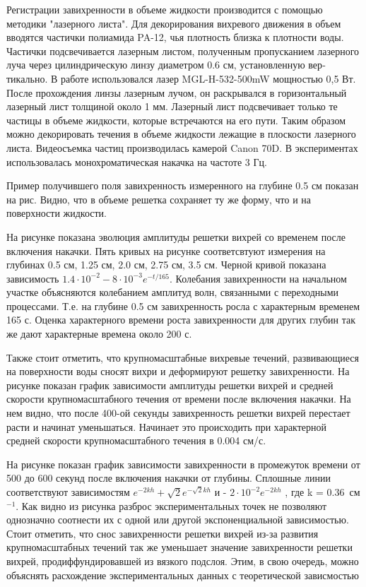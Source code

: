 Регистрации завихренности в объеме жидкости производится с помощью методики "лазерного листа"{}. Для декорирования вихревого движения в объем вводятся частички полиамида PA-12, чья плотность близка к плотности воды. Частички подсвечивается лазерным листом, полученным пропусканием лазер­ного луча через цилиндрическую линзу диаметром 0.6 см, установленную вер­тикально. В работе использовался лазер MGL-H-532-500mW мощностью 0,5 Вт. После прохождения линзы лазерным лучом, он раскрывался в горизонтальный лазерный лист толщиной около 1 мм. Лазерный лист подсвечивает только те частицы в объеме жидкости, которые встречаются на его пути. Таким образом можно декорировать течения в объеме жидкости лежащие в плоскости лазер­ного листа. Видеосъемка частиц производилась камерой Canon 70D. В экспериментах использовалась монохроматическая накачка на частоте 3 Гц.
 

Пример получившего поля завихренность измеренного на глубине 0.5 см показан на рис. Видно, что в объеме решетка сохраняет ту же форму, что и на поверхности жидкости.

На рисунке показана эволюция амплитуды решетки вихрей со временем после включения накачки. Пять кривых на рисунке соответсвтуют измерения на глубинах 0.5 см, 1.25 см, 2.0 см, 2.75 см, 3.5 см. Черной кривой показана зависимость $1.4 \cdot 10^{-2} - 8 \cdot 10^{-3} e^{-t/165}$.  Колебания завихренности на начальном участке объясняются колебанием амплитуд волн, связанными с переходными процессами. Т.е. на глубине 0.5 см завихренность росла с характерным временем 165 с. Оцен­ка характерного времени роста завихренности для других глубин так же дают характерные времена около 200 с.

Также стоит отметить, что крупномасштабные вихревые течений, развивающиеся на поверхности воды сносят вихри и деформируют решетку завихренности. На рисунке показан график зависимости амплитуды решетки вихрей и средней скорости крупномасштабного течения от времени после включения накачки. На нем видно, что после 400-ой секунды завихренность решетки вихрей перестает расти и начинат уменьшаться. Начинает это происходить при характерной средней скорости крупномасштабного течения в 0.004 см/с.

На рисунке показан график зависимости завихренности в промежуток времени от 500 до 600 секунд после включения накачки от глубины. Сплошные линии соответствуют зависимостям $e^{-2kh}+\sqrt{2}e^{-\sqrt{2}kh}$ и - $2 \cdot 10^{-2} e^{-2kh}$ , где k = 0.36~см$^{-1}$. Как видно из рисунка разброс экспериментальных точек не позволяют однозначно соотнести их с одной или другой экспоненциальной зависимостью. Стоит отметить, что снос завихренности решетки вихрей из-за развития крупномасштабных течений так же уменьшает значение завихренно­сти решетки вихрей, продиффундировавшей из вязкого подслоя. Этим, в свою очередь, можно объяснять расхождение экспериментальных данных с теоретической зависмостью

